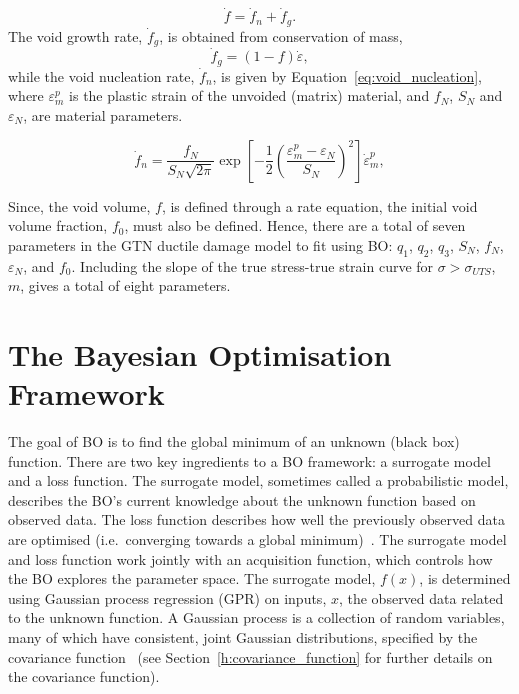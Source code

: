 \documentclass[preprint, review, 12pt]{elsarticle}
\begin{document}
	\begin{equation}
		\dot{f} = \dot{f}_n + \dot{f}_g.
		\label{eq:vvf}
	\end{equation}
	The void growth rate, $\dot{f}_g$, is obtained from conservation of mass,
	\begin{equation}
		\dot{f}_g = (1-f)\dot{\varepsilon},
		\label{eq:void_growth}
	\end{equation}
	while the void nucleation rate, $\dot{f}_n$, is given by Equation~\ref{eq:void_nucleation}, where $\varepsilon^p_m$ is the plastic strain of the unvoided (matrix) material, and $f_N$, $S_N$ and $\varepsilon_N$, are material parameters.

	\begin{equation}
		\dot{f}_n = \frac{f_N}{S_N \sqrt{2\pi}} \exp \left[ -\frac{1}{2} \left( \frac{{\varepsilon}_m^p -\varepsilon_N}{S_N} \right) ^ 2 \right] \dot{\varepsilon}_m^p,
		\label{eq:void_nucleation}
	\end{equation}

	Since, the void volume, $f$, is defined through a rate equation, the initial void volume fraction, $f_0$, must also be defined.
	Hence, there are a total of seven parameters in the GTN ductile damage model to fit using BO: $q_1$, $q_2$, $q_3$, $S_N$, $f_N$, $\varepsilon_N$, and $f_0$.
	Including the slope of the true stress-true strain curve for $\sigma>\sigma_{UTS}$, $m$, gives a total of eight parameters.

	\section{The Bayesian Optimisation Framework}
	\label{h:general_bo}

	The goal of BO is to find the global minimum of an unknown (black box) function.
	There are two key ingredients to a BO framework: a surrogate model and a loss function.
	The surrogate model, sometimes called a probabilistic model, describes the BO's current knowledge about the unknown function based on observed data.
	The loss function describes how well the previously observed data are optimised (i.e.\ converging towards a global minimum)~\cite{SHAHRIARI2016}.
	The surrogate model and loss function work jointly with an acquisition function, which controls how the BO explores the parameter space.
	The surrogate model, $f(x)$, is determined using Gaussian process regression (GPR) on inputs, $x$, the observed data related to the unknown function.
	A Gaussian process is a collection of random variables, many of which have consistent, joint Gaussian distributions, specified by the covariance function~\cite{RASMUSSEN2004, RASMUSSEN2006} (see Section~\ref{h:covariance_function} for further details on the covariance function).
\end{document}
